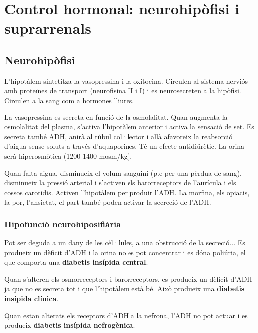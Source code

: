 \section{Control hormonal: neurohipòfisi i suprarrenals}
\label{sec:hormones-i-ronyo}

\subsection{Neurohipòfisi}
\label{sec:neurohipofisi}

L'hipotàlem sintetitza la vasopressina i la oxitocina. Circulen al
sistema nerviós amb proteïnes de transport (neurofisina II i I) i es
neurosecreten a la hipòfisi. Circulen a la sang com a hormones
lliures.

La vasopressina es secreta en funció de la osmolalitat. Quan augmenta
la osmolalitat del plasma, s'activa l'hipotàlem anterior i activa la
sensació de set. Es secreta també ADH, anirà al túbul col·lector i
allà afavoreix la reabsorció d'aigua sense soluts a través
d'aquaporines. Té un efecte antidiürètic. La orina serà
hiperosmòtica (1200-1400 mosm/kg).

Quan falta aigua, disminueix el volum sanguini (p.e per una pèrdua de
sang), disminueix la pressió arterial i s'activen els barorreceptors
de l'aurícula i els cossos carotidis. Activen l'hipotàlem per produir
l'ADH. La morfina, els opiacis, la por, l'ansietat, el part també poden
activar la secreció de l'ADH.

\subsubsection{Hipofunció neurohiposifiària}
\label{sec:hipof-neur}
Pot ser deguda a un dany de les cèl·lules, a una obstrucció de la
secreció... Es produeix un dèficit d'ADH i la orina no es pot
concentrar i es dóna poliúria, el que comporta una \textbf{diabetis
  insípida central}.

Quan s'alteren els osmorreceptors i barorreceptors, es produeix un
dèficit d'ADH ja que no es secreta tot i que l'hipotàlem està bé. Això
produeix una \textbf{diabetis insípida clínica}.

Quan estan alterats els receptors d'ADH a la nefrona, l'ADH no pot
actuar i es produeix \textbf{diabetis insípida nefrogènica}.

